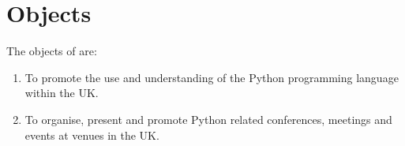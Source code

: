 \section{Objects}\label{sec:objects}
The objects of \shortname{} are:
\begin{enumerate}
    \item To promote the use and understanding of the Python programming language within the UK\@.
    \item To organise, present and promote Python related conferences, meetings and events at venues in the UK\@.
\end{enumerate}
